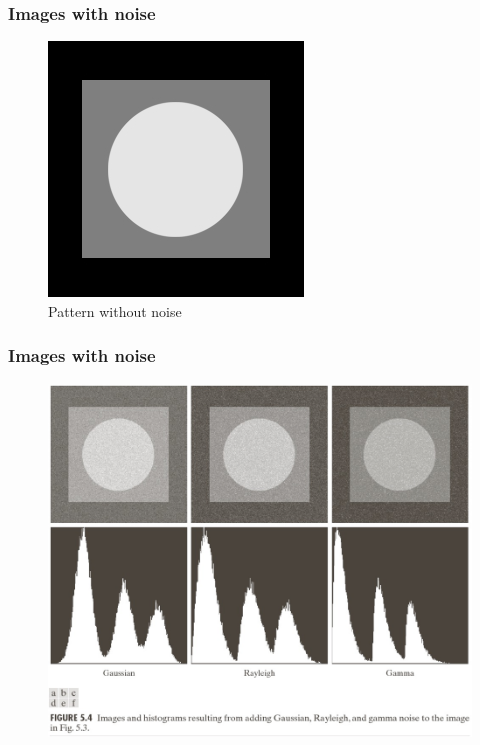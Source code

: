 \documentclass[english,11pt,table,handout]{beamer}
\begin{document}
\frame
{
	\frametitle{Images with noise}
	\begin{figure}[!h]
		\includegraphics[scale=0.8]{pattern_no_noise.jpg}
		\caption{Pattern without noise}
	\end{figure}
}
\frame
{
	\frametitle{Images with noise}
	\begin{figure}[!h]
		\includegraphics[scale=0.6]{im_with_noise_1.png}
	\end{figure}
}
\frame
\end{document}
